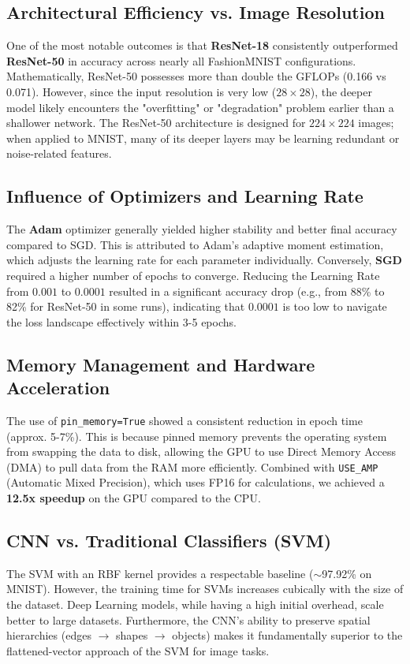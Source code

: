 \documentclass[a4paper,10pt,twocolumn]{article}
\begin{document}
\subsection{Architectural Efficiency vs. Image Resolution}
One of the most notable outcomes is that \textbf{ResNet-18} consistently outperformed \textbf{ResNet-50} in accuracy across nearly all FashionMNIST configurations. Mathematically, ResNet-50 possesses more than double the GFLOPs (0.166 vs 0.071). However, since the input resolution is very low ($28 \times 28$), the deeper model likely encounters the "overfitting" or "degradation" problem earlier than a shallower network. The ResNet-50 architecture is designed for $224 \times 224$ images; when applied to MNIST, many of its deeper layers may be learning redundant or noise-related features.

\subsection{Influence of Optimizers and Learning Rate}
The \textbf{Adam} optimizer generally yielded higher stability and better final accuracy compared to SGD. This is attributed to Adam's adaptive moment estimation, which adjusts the learning rate for each parameter individually. Conversely, \textbf{SGD} required a higher number of epochs to converge. Reducing the Learning Rate from $0.001$ to $0.0001$ resulted in a significant accuracy drop (e.g., from 88\% to 82\% for ResNet-50 in some runs), indicating that $0.0001$ is too low to navigate the loss landscape effectively within 3-5 epochs.

\subsection{Memory Management and Hardware Acceleration}
The use of \texttt{pin\_memory=True} showed a consistent reduction in epoch time (approx. 5-7\%). This is because pinned memory prevents the operating system from swapping the data to disk, allowing the GPU to use Direct Memory Access (DMA) to pull data from the RAM more efficiently. Combined with \texttt{USE\_AMP} (Automatic Mixed Precision), which uses FP16 for calculations, we achieved a \textbf{12.5x speedup} on the GPU compared to the CPU.

\subsection{CNN vs. Traditional Classifiers (SVM)}
The SVM with an RBF kernel provides a respectable baseline ($\sim$97.92\% on MNIST). However, the training time for SVMs increases cubically with the size of the dataset. Deep Learning models, while having a high initial overhead, scale better to large datasets. Furthermore, the CNN's ability to preserve spatial hierarchies (edges $\rightarrow$ shapes $\rightarrow$ objects) makes it fundamentally superior to the flattened-vector approach of the SVM for image tasks.
\end{document}
